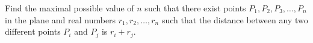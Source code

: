 Find the maximal possible value of $n$ such that there exist points $P_1,P_2,P_3,\ldots,P_n$ in the plane and real numbers $r_1,r_2,\ldots,r_n$ such that the distance between any two different points $P_i$ and $P_j$ is $r_i+r_j$.